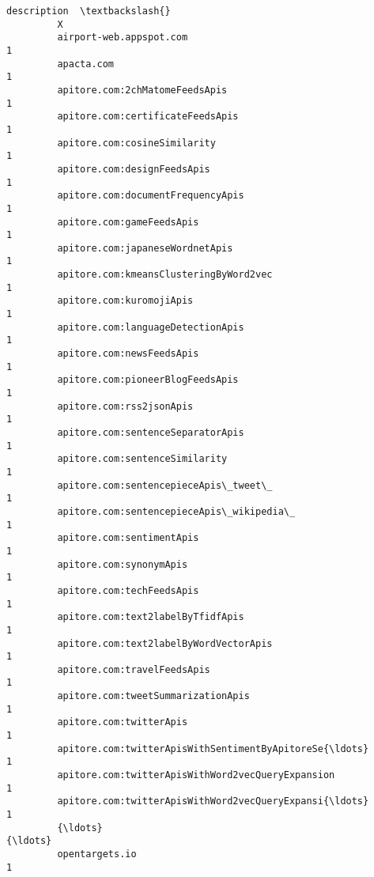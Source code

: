\documentclass[11pt]{article}
\begin{document}
\begin{Verbatim}[commandchars=\\\{\}]
                                                             description  \textbackslash{}
         X                                                                 
         airport-web.appspot.com                                       1   
         apacta.com                                                    1   
         apitore.com:2chMatomeFeedsApis                                1   
         apitore.com:certificateFeedsApis                              1   
         apitore.com:cosineSimilarity                                  1   
         apitore.com:designFeedsApis                                   1   
         apitore.com:documentFrequencyApis                             1   
         apitore.com:gameFeedsApis                                     1   
         apitore.com:japaneseWordnetApis                               1   
         apitore.com:kmeansClusteringByWord2vec                        1   
         apitore.com:kuromojiApis                                      1   
         apitore.com:languageDetectionApis                             1   
         apitore.com:newsFeedsApis                                     1   
         apitore.com:pioneerBlogFeedsApis                              1   
         apitore.com:rss2jsonApis                                      1   
         apitore.com:sentenceSeparatorApis                             1   
         apitore.com:sentenceSimilarity                                1   
         apitore.com:sentencepieceApis\_tweet\_                          1   
         apitore.com:sentencepieceApis\_wikipedia\_                      1   
         apitore.com:sentimentApis                                     1   
         apitore.com:synonymApis                                       1   
         apitore.com:techFeedsApis                                     1   
         apitore.com:text2labelByTfidfApis                             1   
         apitore.com:text2labelByWordVectorApis                        1   
         apitore.com:travelFeedsApis                                   1   
         apitore.com:tweetSummarizationApis                            1   
         apitore.com:twitterApis                                       1   
         apitore.com:twitterApisWithSentimentByApitoreSe{\ldots}            1   
         apitore.com:twitterApisWithWord2vecQueryExpansion             1   
         apitore.com:twitterApisWithWord2vecQueryExpansi{\ldots}            1   
         {\ldots}                                                         {\ldots}   
         opentargets.io                                                1   

\end{Verbatim}
\end{document}

